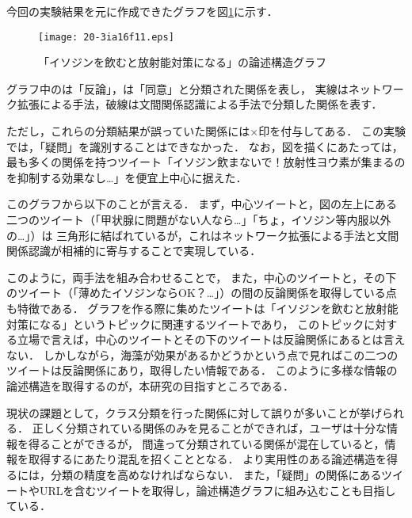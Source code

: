 \documentclass[japanese]{jnlp_1.4}
\newcommand{\addspan}[1]{}
\begin{document}
今回の実験結果を元に作成できたグラフを図\ref{fig:graph}に示す．

\begin{figure}[t]
  \begin{center}
   \texttt{[image: 20-3ia16f11.eps]}
  \end{center}
  \caption{「イソジンを飲むと放射能対策になる」の論述構造グラフ}
  \label{fig:graph}
\end{figure}

グラフ中の\addspan{双方向矢印}は「反論」，\addspan{結合点が丸になっている線}は「同意」と分類された関係を表し，
実線はネットワーク拡張による手法，破線は文間関係認識による手法で分類した関係を表す．
\addspan{なお，図\ref{fig:graph}中のツイート間では，どちらの手法でも分類できた例はなかった．}
ただし，これらの分類結果が誤っていた関係には×印を付与してある．
この実験では，「疑問」を識別することはできなかった．
なお，図を描くにあたっては，最も多くの関係を持つツイート「イソジン飲まないで！放射性ヨウ素が集まるのを抑制する効果なし…」を便宜上中心に据えた．

このグラフから以下のことが言える．
まず，中心ツイートと，図の左上にある二つのツイート（「甲状腺に問題がない人なら…」「ちょ，イソジン等内服以外の…」）は
三角形に結ばれているが，これはネットワーク拡張による手法と文間関係認識が相補的に寄与することで実現している．
\addspan{
ツイート間の関係を独立に表示するだけでなく，3ツイート以上の相互の関係を示すことで，
ユーザにとっての分かりやすさやシステムの信頼性を高められる可能性がある．
}
このように，\addspan{精度を重視した}両手法を組み合わせることで，\addspan{システムの信頼性を高め，説得力のある論述構造をユーザに提供できる可能性が高まる．}
また，中心のツイートと，その下のツイート（「薄めたイソジンならOK？…」）の間の反論関係を取得している点も特徴である．
グラフを作る際に集めたツイートは「イソジンを飲むと放射能対策になる」というトピックに関連するツイートであり，
このトピックに対する立場で言えば，中心のツイートとその下のツイートは反論関係にあるとは言えない．
しかしながら，海藻が効果があるかどうかという点で見ればこの二つのツイートは反論関係にあり，取得したい情報である．
このように多様な情報の論述構造を取得するのが，本研究の目指すところである．

現状の課題として，クラス分類を行った関係に対して誤りが多いことが挙げられる．
正しく分類されている関係のみを見ることができれば，ユーザは十分な情報を得ることができるが，
間違って分類されている関係が混在していると，情報を取得するにあたり混乱を招くこととなる．
より実用性のある論述構造を得るには，分類の精度を高めなければならない．
また，「疑問」の関係にあるツイートやURLを含むツイートを取得し，論述構造グラフに組み込むことも目指している．
\end{document}
